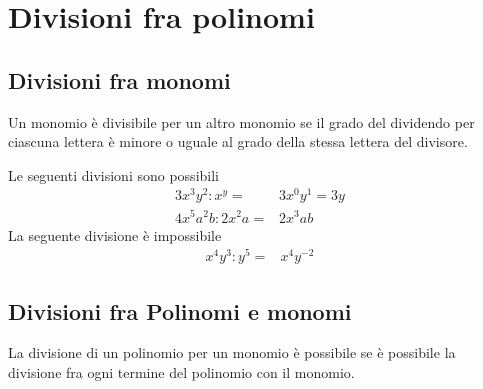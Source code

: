 \chapter{Divisioni fra polinomi}
\label{cha:Divisionipolinomi}
\section{Divisioni fra monomi}
Un monomio è divisibile per un altro monomio se il grado del dividendo per ciascuna lettera è minore o uguale al grado della stessa lettera del divisore.
\begin{esempio}
Le seguenti divisioni sono possibili
\begin{align*}
3x^3y^2:x^y=&3x^0y^1=3y\\
4x^5a^2b:2x^2a=&2x^3ab
\end{align*}
La seguente divisione è impossibile
\begin{align*}
x^4y^3:y^5=&x^4y^{-2}
\end{align*}
\end{esempio}
\section{Divisioni fra Polinomi e monomi}
La divisione di un polinomio per un monomio è possibile se è possibile la divisione fra ogni termine del polinomio con il monomio.
